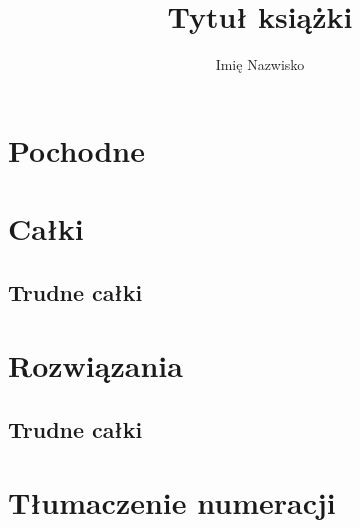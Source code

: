 \documentclass[9pt, twoside, a5paper]{extbook}
\author{Imię Nazwisko}
\title{Tytuł książki}
\theoremstyle{remark}
\begin{document}






\chapter{Pochodne}


\chapter{Całki}









\section{Trudne całki}




\chapter{Rozwiązania}


\section{Trudne całki}





\chapter{Tłumaczenie numeracji}


\printindex

\printindex[persons]

\raggedright
{}

\end{document}
